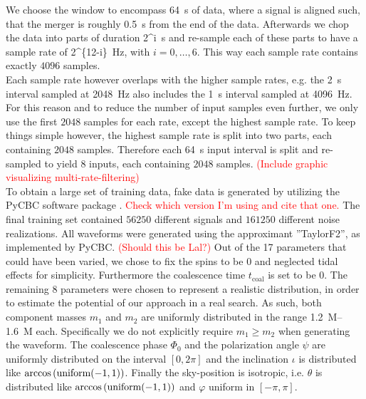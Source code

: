 We choose the window to encompass \SI{64}{\s} of data, where a signal is aligned such, that the merger is roughly \SI{0.5}{\s} from the end of the data. Afterwards we chop the data into parts of duration \SI[parse-numbers=false]{2^i}{\s} and re-sample each of these parts to have a sample rate of \SI[parse-numbers=false]{2^{12-i}}{\hertz}, with $i=0,\dotsc ,6$. This way each sample rate contains exactly $4096$ samples.\\
Each sample rate however overlaps with the higher sample rates, e.g. the \SI{2}{\s} interval sampled at \SI{2048}{\hertz} also includes the \SI{1}{\s} interval sampled at \SI{4096}{\hertz}. For this reason and to reduce the number of input samples even further, we only use the first $2048$ samples for each rate, except the highest sample rate. To keep things simple however, the highest sample rate is split into two parts, each containing $2048$ samples. Therefore each \SI{64}{\s} input interval is split and re-sampled to yield 8 inputs, each containing $2048$ samples. \textcolor{red}{(Include graphic visualizing multi-rate-filtering)}
\medskip\\
To obtain a large set of training data, fake data is generated by utilizing the PyCBC software package \cite{pycbc}. \textcolor{red}{Check which version I'm using and cite that one.} The final training set contained $56250$ different signals and $161250$ different noise realizations. All waveforms were generated using the approximant ''TaylorF2'', as implemented by PyCBC. \textcolor{red}{(Should this be Lal?)} Out of the 17 parameters that could have been varied, we chose to fix the spins to be $0$ and neglected tidal effects for simplicity. Furthermore the coalescence time $t_\text{coal}$ is set to be $0$. The remaining $8$ parameters were chosen to represent a realistic distribution, in order to estimate the potential of our approach in a real search. As such, both component masses $m_1$ and $m_2$ are uniformly distributed in the range \SIrange{1.2}{1.6}{M_\odot} each. Specifically we do not explicitly require $m_1\geq m_2$ when generating the waveform. The coalescence phase $\Phi_0$  and the polarization angle $\psi$ are uniformly distributed on the interval $\left[0, 2\pi\right]$ and the inclination $\iota$ is distributed like $\arccos{\left( \text{uniform}{\left( -1, 1 \right)} \right)}$. Finally the sky-position is isotropic, i.e. $\theta$ is distributed like $\arccos{\left( \text{uniform}{\left( -1, 1 \right)} \right)}$ and $\varphi$ uniform in $\left[-\pi, \pi\right]$.\\
